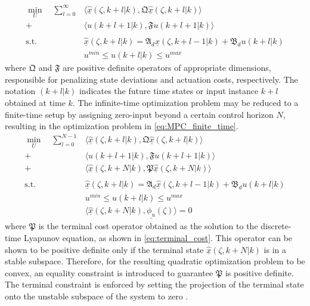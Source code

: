 \begin{equation} \label{eq:MPC_inf_time}
    \begin{aligned}
        \min_{U} \quad \sum_{l=0}^{\infty} &\langle \underline{\hat{x}}(\zeta, k+l | k), \mathfrak{Q} \underline{\hat{x}}(\zeta, k+l | k) \rangle \\
        + &\langle u(k+l+1 | k), \mathfrak{F} u(k+l+1|k) \rangle \\
        \, \\
        \text{s.t.} \quad &\underline{\hat{x}}(\zeta, k+l | k) = \mathfrak{A}_d \underline{\hat{x}}(\zeta, k+l-1 | k) + \mathfrak{B}_d u(k+l | k) \\
        &u^{min} \leq u(k+l | k) \leq u^{max}
    \end{aligned}
\end{equation}
where $\mathfrak{Q}$ and $\mathfrak{F}$ are positive definite operators of appropriate dimensions, responsible for penalizing state deviations and actuation costs, respectively. The notation $(k+l|k)$ indicates the future time states or input instance $k+l$ obtained at time $k$. The infinite-time optimization problem may be reduced to a finite-time setup by assigning zero-input beyond a certain control horizon $N$, resulting in the optimization problem in \eqref{eq:MPC_finite_time}.
\begin{equation} \label{eq:MPC_finite_time}
    \begin{aligned}
        \min_{U} \quad \sum_{l=0}^{N-1} &\langle \underline{\hat{x}}(\zeta, k+l | k), \mathfrak{Q} \underline{\hat{x}}(\zeta, k+l | k) \rangle \\
        + &\langle u(k+l+1 | k), \mathfrak{F} u(k+l+1|k) \rangle \\
        + &\langle \underline{\hat{x}}(\zeta, k+N | k), \mathfrak{P} \underline{\hat{x}}(\zeta, k+N | k) \rangle \\
        \, \\
        \text{s.t.} \quad &\underline{\hat{x}}(\zeta, k+l | k) = \mathfrak{A}_d \underline{\hat{x}}(\zeta, k+l-1 | k) + \mathfrak{B}_d u(k+l | k) \\
        &u^{min} \leq u(k+l | k) \leq u^{max} \\
        & \langle \underline{\hat{x}}(\zeta, k+N | k), \underline{\phi_u}(\zeta) \rangle = 0
    \end{aligned}
\end{equation}
where $\mathfrak{P}$ is the terminal cost operator obtained as the solution to the discrete-time Lyapunov equation, as shown in \eqref{eq:terminal_cost}. This operator can be shown to be positive definite only if the terminal state $\underline{\hat{x}}(\zeta, k+N | k)$ is in a stable subspace. Therefore, for the resulting quadratic optimization problem to be convex, an equality constraint is introduced to guarantee $\mathfrak{P}$ is positive definite. The terminal constraint is enforced by setting the projection of the terminal state onto the unstable subspace of the system to zero \cite{curtainbook, xu2017linear, khatibi2021model}.
